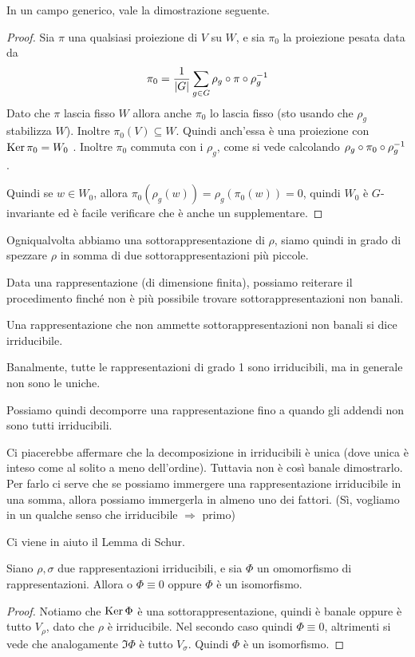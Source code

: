 	In un campo generico, vale la dimostrazione seguente.
	\begin{proof}
		Sia $\pi$ una qualsiasi proiezione di $V$ su $W$, e sia $\pi_0$ la proiezione pesata data da
		\[
		\pi_0=\frac1{\left|G\right|} \sum_{g\in G} \rho_g \circ \pi \circ \rho_g^{-1}
		\]
		Dato che $\pi$ lascia fisso $W$ allora anche $\pi_0$ lo lascia fisso (sto usando che $\rho_g$ stabilizza $W$). Inoltre $\pi_0(V) \subseteq W$. Quindi anch'essa è una proiezione con $\operatorname{Ker} \pi_0=W_0$ . Inoltre $\pi_0$ commuta con i $\rho_g$, come si vede calcolando $\rho_g \circ \pi_0 \circ \rho_g^{-1}$.
		
		Quindi se $w\in W_0$, allora $\pi_0 (\rho_g(w))=\rho_g(\pi_0(w))=0$, quindi $W_0$ è $G$-invariante ed è facile verificare che è anche un supplementare.
	\end{proof}

	Ogniqualvolta abbiamo una sottorappresentazione di $\rho$, siamo quindi in grado di spezzare $\rho$ in somma di due sottorappresentazioni più piccole. 

	Data una rappresentazione (di dimensione finita), possiamo reiterare il procedimento finché non è più possibile trovare sottorappresentazioni non banali.

	\begin{mydef}
		Una rappresentazione che non ammette sottorappresentazioni non banali si dice irriducibile.
	\end{mydef}

	Banalmente, tutte le rappresentazioni di grado 1 sono irriducibili, ma in generale non sono le uniche.

	Possiamo quindi decomporre una rappresentazione fino a quando gli addendi non sono tutti irriducibili.

	Ci piacerebbe affermare che la decomposizione in irriducibili è unica (dove unica è inteso come al solito a meno dell'ordine). Tuttavia non è così banale dimostrarlo. Per farlo ci serve che se possiamo immergere una rappresentazione irriducibile in una somma, allora possiamo immergerla in almeno uno dei fattori. (Sì, vogliamo in un qualche senso che irriducibile $\Rightarrow$ primo)

	Ci viene in aiuto il Lemma di Schur.

	\begin{mytheorem}
		Siano $\rho,\sigma$ due rappresentazioni irriducibili, e sia $\Phi$ un omomorfismo di rappresentazioni. Allora o $\Phi \equiv 0$ oppure $\Phi$ è un isomorfismo.
	\end{mytheorem}
	\begin{proof}
		Notiamo che $\operatorname{Ker} \Phi$ è una sottorappresentazione, quindi è banale oppure è tutto $V_\rho$, dato che $\rho$ è irriducibile. Nel secondo caso quindi $\Phi\equiv 0$, altrimenti si vede che analogamente $\Im \Phi$ è tutto $V_\sigma$. Quindi $\Phi$ è un isomorfismo.
	\end{proof}

